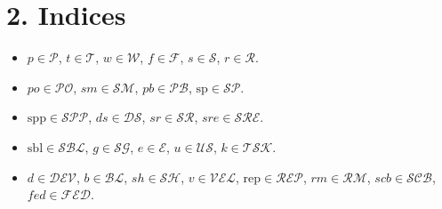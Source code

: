 \documentclass[11pt,a4paper]{article}
\begin{document}
\section{2. Indices}
\begin{itemize}[leftmargin=2em]
  \item $p \in \mathcal{P}$, $t \in \mathcal{T}$, $w \in \mathcal{W}$, $f \in \mathcal{F}$, $s \in \mathcal{S}$, $r \in \mathcal{R}$.
  \item $po \in \mathcal{PO}$, $sm \in \mathcal{SM}$, $pb \in \mathcal{PB}$, $\mathrm{sp} \in \mathcal{SP}$.
  \item $\mathrm{spp} \in \mathcal{SPP}$, $ds \in \mathcal{DS}$, $sr \in \mathcal{SR}$, $sre \in \mathcal{SRE}$.
  \item $\mathrm{sbl} \in \mathcal{SBL}$, $g \in \mathcal{SG}$, $e \in \mathcal{E}$, $u \in \mathcal{US}$, $k \in \mathcal{TSK}$.
  \item $d \in \mathcal{DEV}$, $b \in \mathcal{BL}$, $sh \in \mathcal{SH}$, $v \in \mathcal{VEL}$, $\mathrm{rep} \in \mathcal{REP}$, $rm \in \mathcal{RM}$, $scb \in \mathcal{SCB}$, $fed \in \mathcal{FED}$.
\end{itemize}
\end{document}
